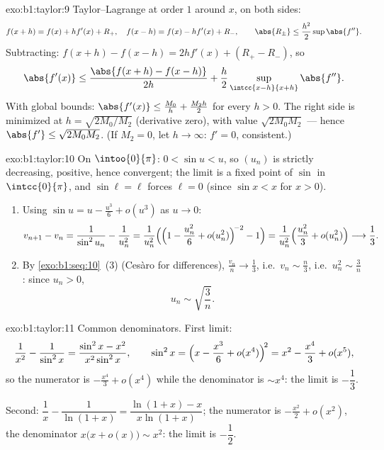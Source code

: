\begin{solution}{exo:b1:taylor:9}
Taylor--Lagrange at order $1$ around $x$, on both sides:
\[
f(x + h) = f(x) + h f'(x) + R_+,\quad
f(x - h) = f(x) - h f'(x) + R_-,
\qquad \abs{R_\pm} \leq \frac{h^2}{2} \sup \abs{f''} .
\]
Subtracting: $f(x+h) - f(x-h) = 2h f'(x) + (R_+ - R_-)$, so
\[
\abs{f'(x)} \leq \frac{\abs{f(x+h) - f(x-h)}}{2h} +
\frac{h}{2}\sup_{\intcc{x-h}{x+h}}\abs{f''} .
\]
With global bounds: $\abs{f'(x)} \leq \frac{M_0}{h} + \frac{M_2
h}{2}$ for every $h > 0$. The right side is minimized at $h =
\sqrt{2M_0/M_2}$ (derivative zero), with value $\sqrt{2M_0M_2}$
--- hence $\abs{f'} \leq \sqrt{2M_0M_2}$. (If $M_2 = 0$, let $h \to
\infty$: $f' = 0$, consistent.)
\end{solution}

\begin{solution}{exo:b1:taylor:10}
On $\intoo{0}{\pi}$: $0 < \sin u < u$, so $(u_n)$ is strictly
decreasing, positive, hence convergent; the limit is a fixed point
of $\sin$ in $\intcc{0}{\pi}$, and $\sin \ell = \ell$ forces $\ell =
0$ (since $\sin x < x$ for $x > 0$).
\begin{enumerate}
  \item Using $\sin u = u - \frac{u^3}{6} + o(u^3)$ as $u \to 0$:
        \[
        v_{n+1} - v_n = \frac{1}{\sin^2 u_n} - \frac{1}{u_n^2}
        = \frac{1}{u_n^2}\Bigl(\Bigl(1 - \frac{u_n^2}{6} +
        o(u_n^2)\Bigr)^{\!-2} - 1\Bigr)
        = \frac{1}{u_n^2}\Bigl(\frac{u_n^2}{3} + o(u_n^2)\Bigr)
        \longrightarrow \frac13 .
        \]
  \item By \cref{exo:b1:seq:10}~(3) (Ces\`aro for differences),
        $\frac{v_n}{n} \to \frac13$, i.e.\ $v_n \sim \frac n3$, i.e.\
        $u_n^2 \sim \frac 3n$: since $u_n > 0$,
        \[
        u_n \sim \sqrt{\frac{3}{n}} .
        \]
\end{enumerate}
\end{solution}

\begin{solution}{exo:b1:taylor:11}
Common denominators. First limit:
\[
\frac{1}{x^2} - \frac{1}{\sin^2 x}
= \frac{\sin^2 x - x^2}{x^2\sin^2 x},
\qquad
\sin^2 x = \Bigl(x - \frac{x^3}{6} + o(x^4)\Bigr)^{\!2}
= x^2 - \frac{x^4}{3} + o(x^5) ,
\]
so the numerator is $-\frac{x^4}{3} + o(x^4)$ while the
denominator is $\sim x^4$: the limit is $-\dfrac13$.

Second: $\dfrac1x - \dfrac{1}{\ln(1+x)} = \dfrac{\ln(1+x) -
x}{x\ln(1+x)}$; the numerator is $-\frac{x^2}{2} + o(x^2)$, the
denominator $x\bigl(x + o(x)\bigr) \sim x^2$: the limit is
$-\dfrac12$.
\end{solution}

